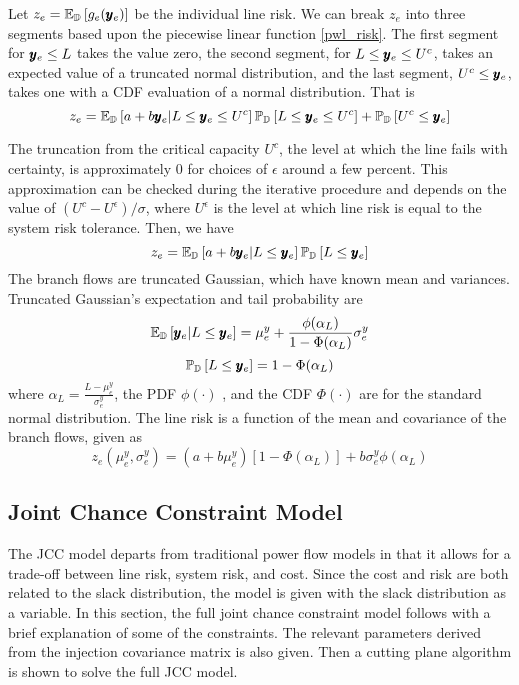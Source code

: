 

Let $ z_e = \mathbb{E}_{\mathbb{D}} \left[ g_e(\pmb{y}_e) \right] $ be the individual line risk. We can break $z_e$ into three segments based upon the piecewise linear function \ref{pwl_risk}.  The first segment for $\pmb{y}_e \leq L$ takes the value zero, the second segment, for $L \leq \pmb{y}_e \leq U^c$, takes an expected value of a truncated normal distribution, and the last segment, $U^c \leq \pmb{y}_e$, takes one with a CDF evaluation of a normal distribution.  That is
\[ z_e = \mathbb{E}_{\mathbb{D}} \left[  a+b\pmb{y}_e | L \leq \pmb{y}_e \leq U^c  \right] \mathbb{P}_{\mathbb{D}} \left[ L\leq \pmb{y}_e \leq U^c \right]  + \mathbb{P}_{\mathbb{D}} \left[  U^c \leq \pmb{y}_e  \right] \] 

 The truncation from the critical capacity $U^c$, the level at which the line fails with certainty, is approximately 0 for choices of $\epsilon$ around a few percent.  This approximation can be checked during the iterative procedure and depends on the value of $ (U^c - U^{\epsilon} )/\sigma $, where $U^\epsilon$ is the level at which line risk is equal to the system risk tolerance.  Then, we have
\[ z_e = \mathbb{E}_{\mathbb{D}} \left[  a+b\pmb{y}_e | L \leq \pmb{y}_e  \right] \mathbb{P}_{\mathbb{D}} \left[ L\leq \pmb{y}_e \right] \]
The branch flows are truncated Gaussian, which have known mean and variances. Truncated Gaussian's expectation and tail probability are
\[  \mathbb{E}_{\mathbb{D}} \left[  \pmb{y}_e | L \leq \pmb{y}_e  \right] = \mu^y_e + \frac{\phi( \alpha_L )}{ 1- \Phi(\alpha_L)} \sigma^y_e \]
\[ \mathbb{P}_{\mathbb{D}} \left[  L \leq \pmb{y}_e  \right] = 1 - \Phi(\alpha_L) \]
where $\alpha_L = \frac{L - \mu^y_e}{\sigma^y_e}$, the PDF $\phi(\cdot)$ , and the CDF $\Phi(\cdot)$ are for the standard normal distribution.  The line risk is a function of the mean and covariance of the branch flows, given as
\begin{equation}\label{line_risk}
z_e(\mu^y_e,\sigma^y_e) = (a + b \mu^y_e)\left[ 1 - \Phi(\alpha_L) \right]  + b \sigma^y_e \phi(\alpha_L) 
\end{equation}







\subsection{Joint Chance Constraint Model}%
The JCC model departs from traditional power flow models in that it allows for a trade-off between line risk, system risk, and cost. Since the cost and risk are both related to the slack distribution, the model is given with the slack distribution as a variable.  In this section, the full joint chance constraint model follows with a brief explanation of some of the constraints.  The relevant parameters derived from the injection covariance matrix is also given.  Then a cutting plane algorithm is shown to solve the full JCC model.


